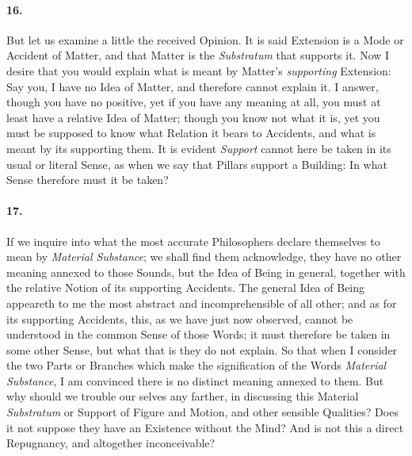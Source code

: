\documentclass[]{article}
\newenvironment{sectionbody}{\begin{multicols}{2}}{\end{multicols}}
\begin{document}
\begin{sectionbody}
\paragraph{16.} But let us examine a little the received Opinion.  It is said
Extension is a Mode or Accident of Matter, and that Matter is the
\emph{Substratum} that supports it.  Now I desire that you
would explain what is meant by Matter's \emph{supporting}
Extension: Say you, I have no Idea of Matter, and therefore
cannot explain it.  I answer, though you have no positive, yet if
you have any meaning at all, you must at least have a relative
Idea of Matter; though you know not what it is, yet you must be
supposed to know what Relation it bears to Accidents, and what is
meant by its supporting them.  It is evident \emph{Support}
cannot here be taken in its usual or literal Sense, as when we
say that Pillars support a Building: In what Sense therefore must
it be taken?



\paragraph{17.} If we inquire into what the most accurate Philosophers declare
themselves to mean by \emph{Material Substance}; we shall find
them acknowledge, they have no other meaning annexed to those
Sounds, but the Idea of Being in general, together with the
relative Notion of its supporting Accidents.  The general Idea of
Being appeareth to me the most abstract and incomprehensible of
all other; and as for its supporting Accidents, this, as we have
just now observed, cannot be understood in the common Sense of
those Words; it must therefore be taken in some other Sense, but
what that is they do not explain.  So that when I consider the
two Parts or Branches which make the signification of the Words
\emph{Material Substance}, I am convinced there is no distinct
meaning annexed to them.  But why should we trouble our selves
any farther, in discussing this Material \emph{Substratum} or
Support of Figure and Motion, and other sensible Qualities? Does
it not suppose they have an Existence without the Mind? And is
not this a direct Repugnancy, and altogether inconceivable?




\end{sectionbody}
\end{document}
